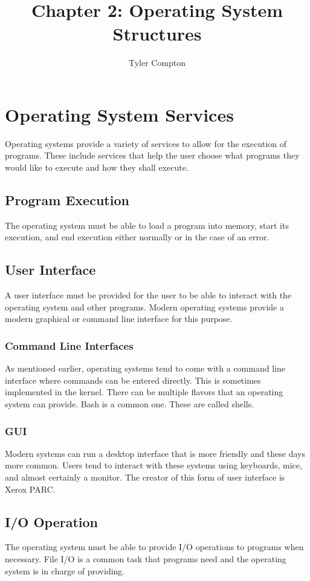 \documentclass{article}
\author{Tyler Compton}
\title{Chapter 2: Operating System Structures}
\begin{document}
\maketitle
\tableofcontents

\section{Operating System Services}
Operating systems provide a variety of services to allow for the execution of
programs. These include services that help the user choose what programs they
would like to execute and how they shall execute.

\subsection{Program Execution}
The operating system must be able to load a program into memory, start its
execution, and end execution either normally or in the case of an error.

\subsection{User Interface}
A user interface must be provided for the user to be able to interact with the
operating system and other programs. Modern operating systems provide a
modern graphical or command line interface for this purpose.

\subsubsection{Command Line Interfaces}
As mentioned earlier, operating systems tend to come with a command line
interface where commands can be entered directly. This is sometimes implemented
in the kernel. There can be multiple flavors that an operating system can
provide. Bash is a common one. These are called shells.

\subsubsection{GUI}
Modern systems can run a desktop interface that is more friendly and these days
more common. Users tend to interact with these systems using keyboards, mice,
and almost certainly a monitor. The creator of this form of user interface is
Xerox PARC.

\subsection{I/O Operation}
The operating system must be able to provide I/O operations to programs when
necessary. File I/O is a common task that programs need and the operating
system is in charge of providing.
\end{document}
